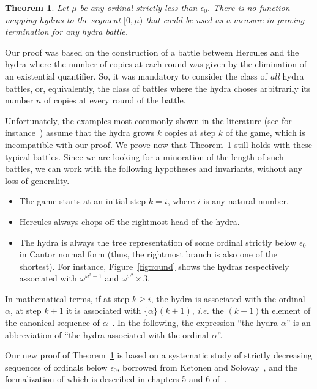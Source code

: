 \documentclass{easychair}
\newtheorem{theorem}{Theorem}
\newcommand{\canonseq}[2]{\mbox{$\{#1\}(#2)$}}
\begin{document}
\begin{theorem}
  Let $\mu$ be any ordinal strictly less than $\epsilon_0$.
  There is no function mapping hydras to the segment $[0,\mu)$ that could be used as a measure in proving termination for \emph{any} hydra battle.\label{thm3}
\end{theorem}

Our proof was based on the construction of a battle between Hercules and the hydra where the
number of copies at each round was given by the elimination of an existential quantifier. So, it was mandatory to consider the class of \emph{all} hydra battles, or, equivalently, the class of battles where the hydra choses arbitrarily its number $n$ of copies at every round of the battle.

Unfortunately, the examples  most commonly shown in the literature
(see for instance~\cite{KP82, bauer2008, BauerHydra}) 
assume that the hydra grows $k$ copies at step $k$ of the game, which is incompatible with our proof.
We prove now that Theorem~\ref{thm3} still holds with these typical battles.
Since we are looking  for a minoration of the length of such battles,
we can work with the following hypotheses and invariants, 
without any loss of generality.
 
 \begin{itemize}
   \item The game starts at an initial step $k=i$, where $i$ is any natural number.
   \item Hercules always chops off the rightmost head of the hydra.
   \item  The hydra is always the tree representation of some ordinal strictly below $\epsilon_0$ in Cantor normal
     form (thus, the rightmost branch is also one of the shortest).
     For instance, Figure~\ref{fig:round} shows the hydras respectively associated with  $\omega^{\omega^2+1}$ and $\omega^{\omega^2}\times 3$.
 \end{itemize}
 
 In mathematical terms, if at step $k\geq i$, the hydra is associated with the ordinal $\alpha$, at step $k+1$ it is associated with
 $\canonseq{\alpha}{k+1}$, \emph{i.e.} the $(k+1)$th element of the canonical sequence of $\alpha$~\cite{KS81}. In the following,  the expression ``the hydra $\alpha$'' is an abbreviation of ``the hydra associated with the ordinal $\alpha$''.

 Our new proof of Theorem~\ref{thm3} is based on a systematic study of strictly decreasing sequences of ordinals below $\epsilon_0$, borrowed from Ketonen and Solovay~\cite{KS81}, and the formalization of which is described  in chapters 5 and 6 of~\cite{HydraBook}.
 
\end{document}
